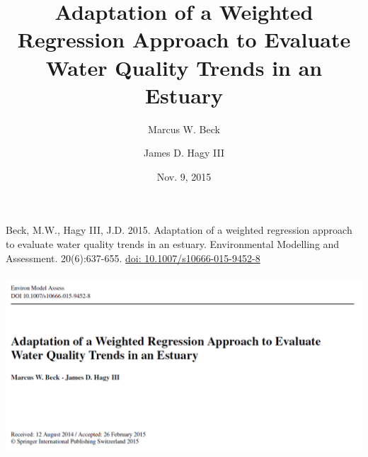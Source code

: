 \documentclass[serif]{beamer}\usepackage[]{graphicx}\usepackage[]{color}
\begin{document}
\title[WRTDS in Tidal Waters]{\textbf{Adaptation of a Weighted Regression Approach to Evaluate Water Quality Trends in an Estuary}\vspace{-0.15in}}
\author[M. Beck]{Marcus W. Beck \and James D. Hagy III}


\date{Nov. 9, 2015}


\begin{frame}
\titlepage
\end{frame}

\begin{frame}
\small
Beck, M.W., Hagy III, J.D. 2015. Adaptation of a weighted regression approach to evaluate water quality trends in an estuary. Environmental Modelling and Assessment. 20(6):637-655. \href{http://dx.doi.org/10.1007/s10666-015-9452-8}{doi: 10.1007/s10666-015-9452-8} \\~\\
\includegraphics[width = \textwidth]{fig/emapaper.png} 
\end{frame}
\end{document}
